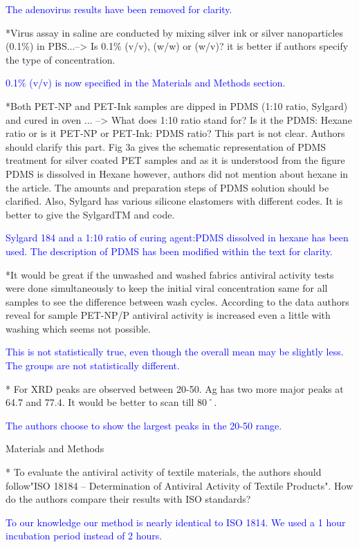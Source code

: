 \documentclass[12pt]{letter}
\newcommand{\blue}[1]{\textcolor{blue}{#1}} %
\begin{document}
\blue{The adenovirus results have been removed for clarity. }

*Virus assay in saline are conducted by mixing silver ink or silver nanoparticles (0.1\%) in PBS...--> Is 0.1\% (v/v), (w/w) or (w/v)? it is better if authors specify the type of concentration.

\blue{0.1\% (v/v) is now specified in the Materials and Methods section. }

*Both PET-NP and PET-Ink samples are dipped in PDMS (1:10 ratio, Sylgard) and cured in oven ... --> What does 1:10 ratio stand for? Is it the PDMS: Hexane ratio or is it PET-NP or PET-Ink: PDMS ratio? This part is not clear. Authors should clarify this part. Fig 3a gives the schematic representation of PDMS treatment for silver coated PET samples and as it is understood from the figure PDMS is dissolved in Hexane however, authors did not mention about hexane in the article. The amounts and preparation steps of PDMS solution should be clarified. Also, Sylgard has various silicone elastomers with different codes. It is better to give the SylgardTM and code.

\blue{Sylgard 184 and a 1:10 ratio of curing agent:PDMS dissolved in hexane has been used. The description of PDMS has been modified within the text for clarity. }

*It would be great if the unwashed and washed fabrics antiviral activity tests were done simultaneously to keep the initial viral concentration same for all samples to see the difference between wash cycles. According to the data authors reveal for sample PET-NP/P antiviral activity is increased even a little with washing which seems not possible.

\blue{This is not statistically true, even though the overall mean may be slightly less. The groups are not statistically different.}

* For XRD peaks are observed between 20-50. Ag has two more major peaks at 64.7 and 77.4. It would be better to scan till 80˚.

\blue{The authors choose to show the largest peaks in the 20-50 range. }

Materials and Methods

* To evaluate the antiviral activity of textile materials, the authors should follow"ISO 18184 – Determination of Antiviral Activity of Textile Products". How do the authors compare their results with ISO standards?

\blue{To our knowledge our method is nearly identical to ISO 1814. We used a 1 hour incubation period instead of 2 hours.}
\end{document}
